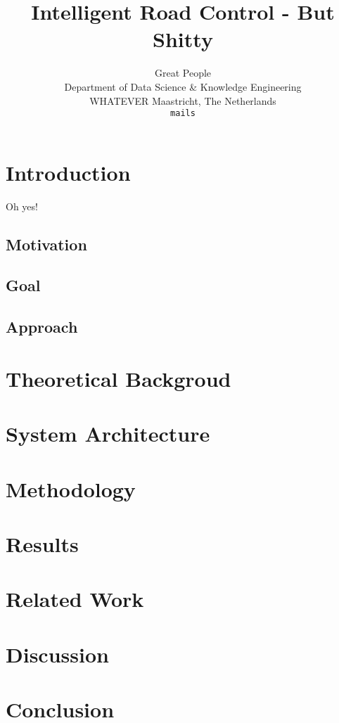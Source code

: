 \documentclass[10pt]{article}
\title{Intelligent Road Control - But Shitty}
\author{Great People \\
	Department of Data Science \& Knowledge Engineering\\
	WHATEVER Maastricht, The Netherlands\\
	{\tt mails}
  }
\begin{document}
\maketitle

\begin{abstract}
	\lipsum[1]
\end{abstract}

\section{Introduction}
	Oh yes! \citep{god0000his}
	\lipsum[3]
	
\subsection{Motivation}
\lipsum[2]

\subsection{Goal}
\lipsum[2]

\subsection{Approach}
\lipsum[2]

\section{Theoretical Backgroud}
	\lipsum[2-3]
	
\section{System Architecture}
	\lipsum[2-3]
	
\section{Methodology}
	\lipsum[2-3]

\section{Results}
	\lipsum[2-3]

\section{Related Work}
	\lipsum[2-3]

\section{Discussion}
	\lipsum[2-3]
	
\section{Conclusion}
	\lipsum[2-3]

{\tiny\printbibliography}
\end{document}
